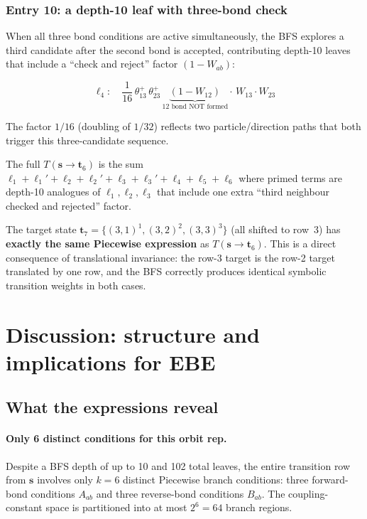 \documentclass[11pt,a4paper]{article}
\newcommand{\W}[1]{W_{#1}}
\newcommand{\Afwd}[1]{\theta^{+}_{#1}}
\newcommand{\s}{\mathbf{s}}
\newcommand{\tp}{\mathbf{t}}
\begin{document}
\subsubsection*{Entry 10: a depth-10 leaf with three-bond check}

When all three bond conditions are active simultaneously, the BFS explores
a third candidate after the second bond is accepted, contributing depth-10
leaves that include a ``check and reject'' factor $(1-\W{ab})$:

\begin{equation}
  \ell_4:\quad
  \frac{1}{16}\,\Afwd{13}\,\Afwd{23}\,
  \underbrace{(1-\W{12})}_{\text{12 bond NOT formed}}\!\cdot\,\W{13}\cdot\W{23}
  \label{eq:l4}
\end{equation}

The factor $1/16$ (doubling of $1/32$) reflects two particle/direction paths
that both trigger this three-candidate sequence.

\medskip
The full $T(\s\to\tp_6)$ is the sum
$\ell_1+\ell_1'+\ell_2+\ell_2'+\ell_3+\ell_3'+\ell_4+\ell_5+\ell_6$
where primed terms are depth-10 analogues of $\ell_1,\ell_2,\ell_3$ that
include one extra ``third neighbour checked and rejected'' factor.

\bigskip
The target state $\tp_7=\{(3,1)^1,(3,2)^2,(3,3)^3\}$ (all shifted to row~3)
has \textbf{exactly the same Piecewise expression} as $T(\s\to\tp_6)$.
This is a direct consequence of translational invariance: the row-3 target is
the row-2 target translated by one row, and the BFS correctly produces
identical symbolic transition weights in both cases.

\section{Discussion: structure and implications for EBE}

\subsection{What the expressions reveal}

\paragraph{Only 6 distinct conditions for this orbit rep.}
Despite a BFS depth of up to 10 and 102 total leaves, the entire transition
row from $\s$ involves only $k=6$ distinct Piecewise branch conditions:
three forward-bond conditions $A_{ab}$ and three reverse-bond conditions
$B_{ab}$.  The coupling-constant space is partitioned into at most $2^6=64$
branch regions.
\end{document}
